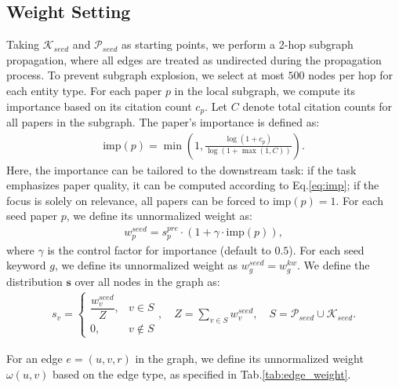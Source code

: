\subsection{Weight Setting}
Taking $\mathcal{K}_{seed}$ and $\mathcal{P}_{seed}$ as starting points, we perform a 2-hop subgraph propagation, where all edges are treated as undirected during the propagation process.
To prevent subgraph explosion, we select at most $500$ nodes per hop for each entity type.
For each paper $p$ in the local subgraph, we compute its importance based on its citation count $c_p$.
Let $C$ denote total citation counts for all papers in the subgraph.
The paper's importance is defined as:
\begin{align}
\label{eq:imp}
    \text{imp}(p)=\min\left(1,\frac{\log(1+c_p)}{\log(1+\max(1,C))}\right).
\end{align}
Here, the importance can be tailored to the downstream task: if the task emphasizes paper quality, it can be computed according to Eq.\ref{eq:imp}; if the focus is solely on relevance, all papers can be forced to $\text{imp}(p)=1$.
For each seed paper $p$, we define its unnormalized weight as:
\begin{align}
\label{eq:wp}
    w_p^{seed}=s_p^{pre}\cdot(1+\gamma\cdot \text{imp}(p)),
\end{align}
where $\gamma$ is the control factor for importance (default to $0.5$).
For each seed keyword $g$, we define its unnormalized weight as $w_g^{seed} = w_g^{kw}$.
We define the distribution $\mathbf{s}$ over all nodes in the graph as:
\begin{align}
    s_v =
\begin{cases}
\dfrac{w_v^{seed}}{Z}, & v \in S \\
0, & v \notin S
\end{cases},\quad Z = \sum_{v \in S} w_v^{seed},\quad S = \mathcal{P}_{seed} \cup \mathcal{K}_{seed}.
\end{align}



 For an edge $e = (u, v, r)$ in the graph, we define its unnormalized weight $\omega(u,v)$ based on the edge type, as specified in Tab.\ref{tab:edge_weight}.

